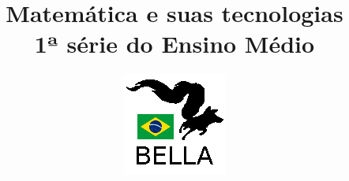 \documentclass{book}
\begin{document}
\title{Matemática e suas tecnologias \\
1ª série do Ensino Médio}
\author{\includegraphics{../../logos/128x128-brazil.png}}

\maketitle

\tableofcontents







\end{document}
